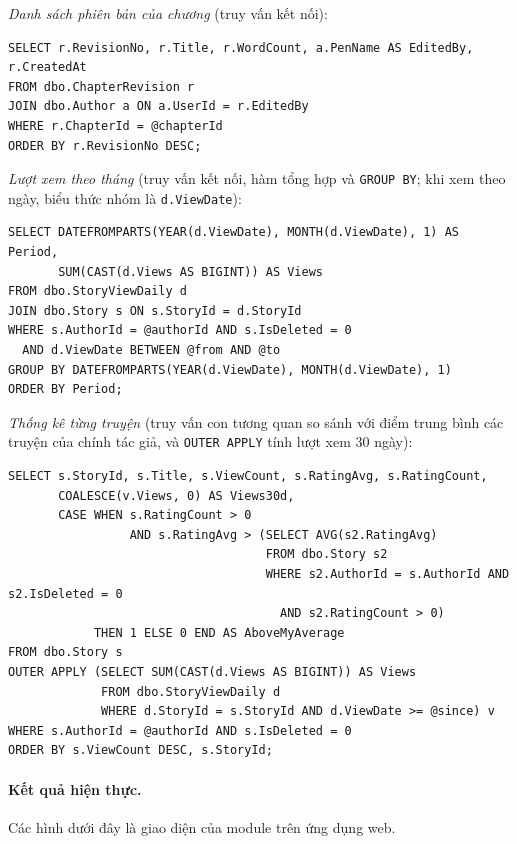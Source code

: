 \textit{Danh sách phiên bản của chương} (truy vấn kết nối):
\begin{verbatim}
SELECT r.RevisionNo, r.Title, r.WordCount, a.PenName AS EditedBy, r.CreatedAt
FROM dbo.ChapterRevision r
JOIN dbo.Author a ON a.UserId = r.EditedBy
WHERE r.ChapterId = @chapterId
ORDER BY r.RevisionNo DESC;
\end{verbatim}

\textit{Lượt xem theo tháng} (truy vấn kết nối, hàm tổng hợp và \texttt{GROUP BY}; khi xem theo ngày, biểu thức nhóm là \texttt{d.ViewDate}):
\begin{verbatim}
SELECT DATEFROMPARTS(YEAR(d.ViewDate), MONTH(d.ViewDate), 1) AS Period,
       SUM(CAST(d.Views AS BIGINT)) AS Views
FROM dbo.StoryViewDaily d
JOIN dbo.Story s ON s.StoryId = d.StoryId
WHERE s.AuthorId = @authorId AND s.IsDeleted = 0
  AND d.ViewDate BETWEEN @from AND @to
GROUP BY DATEFROMPARTS(YEAR(d.ViewDate), MONTH(d.ViewDate), 1)
ORDER BY Period;
\end{verbatim}

\textit{Thống kê từng truyện} (truy vấn con tương quan so sánh với điểm trung bình các truyện của chính tác giả, và \texttt{OUTER APPLY} tính lượt xem 30 ngày):
\begin{verbatim}
SELECT s.StoryId, s.Title, s.ViewCount, s.RatingAvg, s.RatingCount,
       COALESCE(v.Views, 0) AS Views30d,
       CASE WHEN s.RatingCount > 0
                 AND s.RatingAvg > (SELECT AVG(s2.RatingAvg)
                                    FROM dbo.Story s2
                                    WHERE s2.AuthorId = s.AuthorId AND s2.IsDeleted = 0
                                      AND s2.RatingCount > 0)
            THEN 1 ELSE 0 END AS AboveMyAverage
FROM dbo.Story s
OUTER APPLY (SELECT SUM(CAST(d.Views AS BIGINT)) AS Views
             FROM dbo.StoryViewDaily d
             WHERE d.StoryId = s.StoryId AND d.ViewDate >= @since) v
WHERE s.AuthorId = @authorId AND s.IsDeleted = 0
ORDER BY s.ViewCount DESC, s.StoryId;
\end{verbatim}

\paragraph{Kết quả hiện thực.} Các hình dưới đây là giao diện của module trên ứng dụng web.



